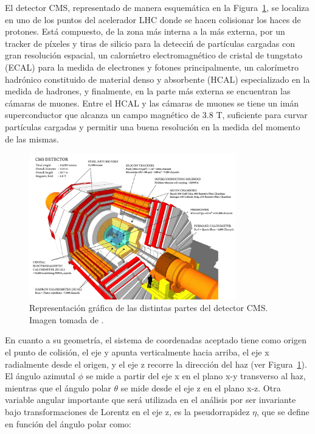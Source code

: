 
El detector CMS, representado de manera esquem\'atica en la Figura~\ref{fig:CMS}, se localiza en uno de los puntos del acelerador LHC donde se hacen colisionar los haces de protones. Est\'a compuesto, de la zona m\'as interna a la m\'as externa, por un tracker de p\'ixeles y tiras de silicio para la detecci\'n de partículas cargadas con gran resoluci\'on espacial, un calor\'metro electromagn\'etico de cristal de tungstato (ECAL) para la medida de electrones y fotones principalmente, un calor\'imetro hadr\'onico constituido de material denso y absorbente (HCAL) especializado en la medida de hadrones, y finalmente, en la parte m\'as externa se encuentran las c\'amaras de muones. Entre el HCAL y las c\'amaras de muones se tiene un im\'an superconductor que alcanza un campo magn\'etico de 3.8 T, suficiente para curvar part\'iculas cargadas y permitir una buena resoluci\'on en la medida del momento de las mismas.

\begin{figure}[h]
\centering
\includegraphics[width=0.80\textwidth]{figures/cms_160312_02.png}
\caption{Representaci\'on gr\'afica de las distintas partes del detector CMS. Imagen tomada de \cite{Sakuma:2665537}.}
\label{fig:CMS}        
\end{figure}

En cuanto a su geometr\'ia, el sistema de coordenadas aceptado tiene como origen el punto de colisi\'on, el eje y apunta verticalmente hacia arriba, el eje x radialmente desde el origen, y el eje z recorre la direcci\'on del haz (ver Figura~\ref{fig:CMS}). El \'angulo azimutal $\phi$ se mide a partir del eje x en el plano x-y transverso al haz, mientras que el \'angulo polar $\theta$ se mide desde el eje z en el plano x-z. Otra variable angular importante que ser\'a utilizada en el an\'alisis por ser invariante bajo transformaciones de Lorentz en el eje z, es la pseudorrapidez $\eta$, que se define en funci\'on del \'angulo polar como: \\

